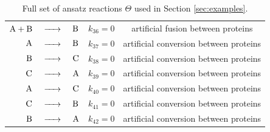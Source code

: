 \documentclass[oneside, abstracton, titlepage]{scrartcl}
\begin{document}
\begin{table}
\begin{tabular}{rclcc}
			$\ce{A + B}$ &$\ce{->}$& $\ce{B}$ & $k_{36} = 0$ & artificial fusion between proteins\\
			$\ce{A}$ &$\ce{->}$& $\ce{B}$ & $k_{37} = 0$ & artificial conversion between proteins\\
			$\ce{B}$ &$\ce{->}$& $\ce{C}$ & $k_{38} = 0$ & artificial conversion between proteins\\
			$\ce{C}$ &$\ce{->}$& $\ce{A}$ & $k_{39} = 0$ & artificial conversion between proteins\\
			$\ce{A}$ &$\ce{->}$& $\ce{C}$ & $k_{40} = 0$ & artificial conversion between proteins\\
			$\ce{C}$ &$\ce{->}$& $\ce{B}$ & $k_{41} = 0$ & artificial conversion between proteins\\
			$\ce{B}$ &$\ce{->}$& $\ce{A}$ & $k_{42} = 0$ & artificial conversion between proteins
		\end{tabular}
		\caption{Full set of ansatz reactions $\Theta$ used in Section \ref{sec:examples}.}
		\label{tab:reaction-library}
	\end{table}
\end{document}
